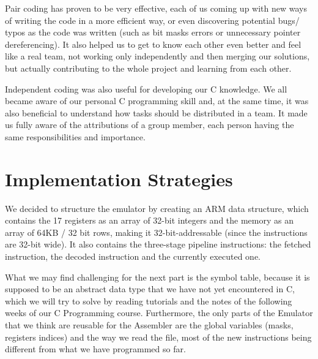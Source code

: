 \documentclass[11pt]{article}
\begin{document}
Pair coding has proven to be very effective, each of us coming up with new ways of writing the code in a more efficient way, or even discovering potential bugs/ typos as the code was written (such as bit masks errors or unnecessary pointer dereferencing). It also helped us to get to know each other even better and feel like a real team, not working only independently and then merging our solutions, but actually contributing to the whole project and learning from each other. \\ \par \noindent
Independent coding was also useful for developing our C knowledge. We all became aware of our personal C programming skill and, at the same time, it was also beneficial to understand how tasks should be distributed in a team. It made us fully aware of the attributions of a group member, each person having the same responsibilities and importance. 
\\


\section{Implementation Strategies} 

We decided to structure the emulator by creating an ARM data structure, which contains the 17 registers as an array of 32-bit integers and the memory as an array of 64KB / 32 bit rows, making it 32-bit-addressable (since the instructions are 32-bit wide). It also contains the three-stage pipeline instructions: the fetched instruction, the decoded instruction and the currently executed one. \\ \par \noindent
What we may find challenging for the next part is the symbol table, because it is supposed to be an abstract data type that we have not yet encountered in C, which we will try to solve by reading tutorials and the notes of the following weeks of our C Programming course. Furthermore, the only parts of the Emulator that we think are reusable for the Assembler are the global variables (masks, registers indices) and the way we read the file, most of the new instructions being different from what we have programmed so far. 
\end{document}
